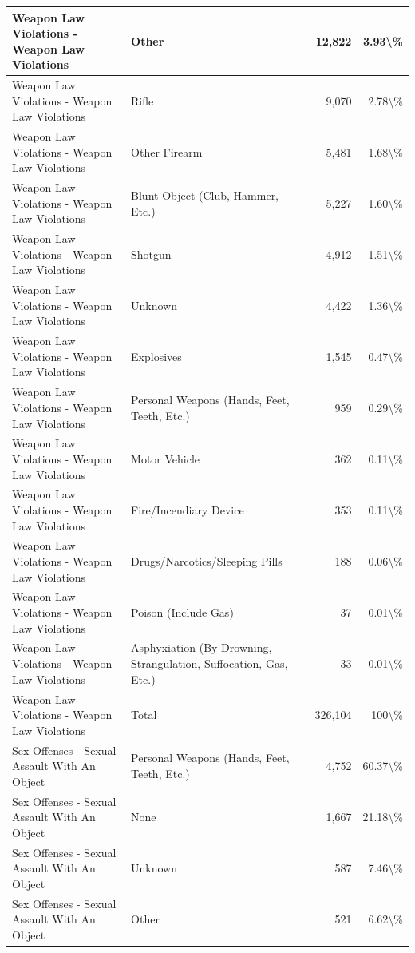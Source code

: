 \documentclass[
]{krantz}
\begin{document}
\begin{longtable}[t]{l|l|r|r}
\hline
Weapon Law Violations - Weapon Law Violations & Other & 12,822 & 3.93\textbackslash{}\%\\
\hline
Weapon Law Violations - Weapon Law Violations & Rifle & 9,070 & 2.78\textbackslash{}\%\\
\hline
Weapon Law Violations - Weapon Law Violations & Other Firearm & 5,481 & 1.68\textbackslash{}\%\\
\hline
Weapon Law Violations - Weapon Law Violations & Blunt Object (Club, Hammer, Etc.) & 5,227 & 1.60\textbackslash{}\%\\
\hline
Weapon Law Violations - Weapon Law Violations & Shotgun & 4,912 & 1.51\textbackslash{}\%\\
\hline
Weapon Law Violations - Weapon Law Violations & Unknown & 4,422 & 1.36\textbackslash{}\%\\
\hline
Weapon Law Violations - Weapon Law Violations & Explosives & 1,545 & 0.47\textbackslash{}\%\\
\hline
Weapon Law Violations - Weapon Law Violations & Personal Weapons (Hands, Feet, Teeth, Etc.) & 959 & 0.29\textbackslash{}\%\\
\hline
Weapon Law Violations - Weapon Law Violations & Motor Vehicle & 362 & 0.11\textbackslash{}\%\\
\hline
Weapon Law Violations - Weapon Law Violations & Fire/Incendiary Device & 353 & 0.11\textbackslash{}\%\\
\hline
Weapon Law Violations - Weapon Law Violations & Drugs/Narcotics/Sleeping Pills & 188 & 0.06\textbackslash{}\%\\
\hline
Weapon Law Violations - Weapon Law Violations & Poison (Include Gas) & 37 & 0.01\textbackslash{}\%\\
\hline
Weapon Law Violations - Weapon Law Violations & Asphyxiation (By Drowning, Strangulation, Suffocation, Gas, Etc.) & 33 & 0.01\textbackslash{}\%\\
\hline
Weapon Law Violations - Weapon Law Violations & Total & 326,104 & 100\textbackslash{}\%\\
\hline
Sex Offenses - Sexual Assault With An Object & Personal Weapons (Hands, Feet, Teeth, Etc.) & 4,752 & 60.37\textbackslash{}\%\\
\hline
Sex Offenses - Sexual Assault With An Object & None & 1,667 & 21.18\textbackslash{}\%\\
\hline
Sex Offenses - Sexual Assault With An Object & Unknown & 587 & 7.46\textbackslash{}\%\\
\hline
Sex Offenses - Sexual Assault With An Object & Other & 521 & 6.62\textbackslash{}\%\\

\end{longtable}
\end{document}
